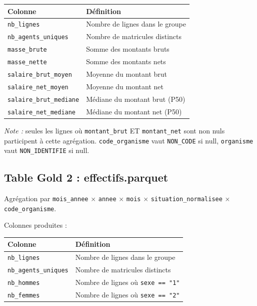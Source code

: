 \documentclass[12pt,a4paper,french]{report}
\begin{document}
\begin{tabularx}{\textwidth}{lX}
  \toprule
  \textbf{Colonne} & \textbf{Définition} \\
  \midrule
  \texttt{nb\_lignes} & Nombre de lignes dans le groupe \\
  \texttt{nb\_agents\_uniques} & Nombre de matricules distincts \\
  \texttt{masse\_brute} & Somme des montants bruts \\
  \texttt{masse\_nette} & Somme des montants nets \\
  \texttt{salaire\_brut\_moyen} & Moyenne du montant brut \\
  \texttt{salaire\_net\_moyen} & Moyenne du montant net \\
  \texttt{salaire\_brut\_mediane} & Médiane du montant brut (P50) \\
  \texttt{salaire\_net\_mediane} & Médiane du montant net (P50) \\
  \bottomrule
\end{tabularx}

\textit{Note :} seules les lignes où \texttt{montant\_brut} ET
\texttt{montant\_net} sont non nuls participent à cette agrégation.
\texttt{code\_organisme} vaut \texttt{NON\_CODE} si null, \texttt{organisme}
vaut \texttt{NON\_IDENTIFIE} si null.

\subsection{Table Gold 2 : effectifs.parquet}

Agrégation par \texttt{mois\_annee} $\times$ \texttt{annee} $\times$
\texttt{mois} $\times$ \texttt{situation\_normalisee} $\times$
\texttt{code\_organisme}.

Colonnes produites :

\begin{tabularx}{\textwidth}{lX}
  \toprule
  \textbf{Colonne} & \textbf{Définition} \\
  \midrule
  \texttt{nb\_lignes} & Nombre de lignes dans le groupe \\
  \texttt{nb\_agents\_uniques} & Nombre de matricules distincts \\
  \texttt{nb\_hommes} & Nombre de lignes où \texttt{sexe == "1"} \\
  \texttt{nb\_femmes} & Nombre de lignes où \texttt{sexe == "2"} \\
  \bottomrule
\end{tabularx}
\end{document}
